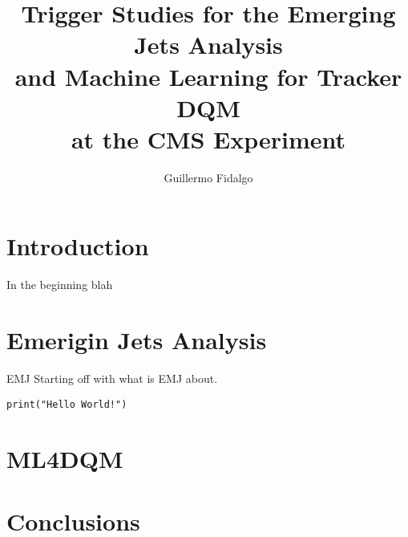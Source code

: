 \documentclass{beamer}
\title[EMJ and ML4TkDQM]{Trigger Studies for the Emerging Jets Analysis \\and Machine Learning for Tracker DQM \\at the CMS Experiment}
\author[GAFR]{Guillermo Fidalgo}
\institute[UPRM]{University of Puerto Rico - Mayagüez}
\begin{document}
\maketitle

\begin{frame}
	\tableofcontents
\end{frame}

\section{Introduction}
\begin{frame}{In the beginning}
	blah
\end{frame}

\section{Emerigin Jets Analysis}

\begin{frame}[fragile]{EMJ}
	Starting off with what is EMJ about.

	\begin{verbatim}
print("Hello World!")
\end{verbatim}
\end{frame}

\section{ML4DQM}


\section{Conclusions}
\end{document}
